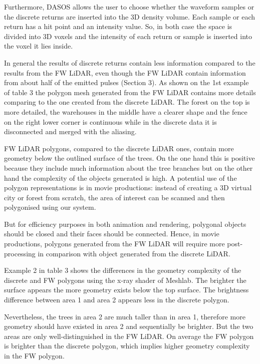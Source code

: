 \documentclass{subfiles}
\begin{document}
Furthermore, DASOS allows the user to choose whether the waveform samples or the discrete returns are inserted into the 3D density volume. Each sample or each return has a hit point and an intensity value. So, in both case the space is divided into 3D voxels and the intensity of each return or sample is inserted into the voxel it lies inside.

In general the results of discrete returns contain less information compared to the results from the FW LiDAR, even though the FW LiDAR contain information from about half of the emitted pulses (Section 3). As shown on the 1st example of table 3 the polygon mesh generated from the FW LiDAR contains more details comparing to the one created from the discrete LiDAR. The forest on the top is more detailed, the warehouses in the middle have a clearer shape and the fence on the right lower corner is continuous while in the discrete data it is disconnected and merged with the aliasing.

FW LiDAR polygons, compared to the discrete LiDAR ones, contain more geometry below the outlined surface of the trees. On the one hand this is positive because they include much information about the tree branches but on the other hand the complexity of the objects generated is high. A potential use of the polygon representations is in movie productions: instead of creating a 3D virtual city or forest from scratch, the area of interest can be scanned and then polygonised using our system. 

But for efficiency purposes in both animation and rendering, polygonal objects should be closed and their faces should be connected. Hence, in movie productions, polygons generated from the FW LiDAR will require more post-processing in comparison with object generated from the discrete LiDAR.

Example 2 in table 3 shows the differences in the geometry complexity of the discrete and FW polygons using the x-ray shader of Meshlab. The brighter the surface appears the more geometry exists below the top surface. The brightness difference between area 1 and area 2 appears less in the discrete polygon.

Nevertheless, the trees in area 2 are much taller than in area 1, therefore more geometry should have existed in area 2 and sequentially be brighter. But the two areas are only well-distinguished in the FW LiDAR. On average the FW polygon is brighter than the discrete polygon, which implies higher geometry complexity in the FW polygon.
\end{document}

